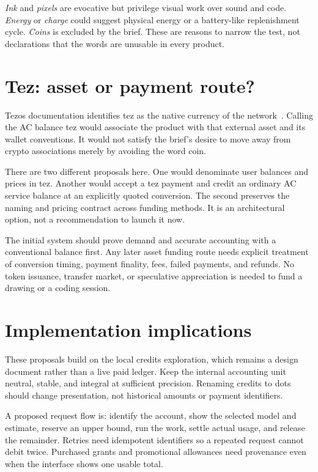 \documentclass[10pt,letterpaper,twocolumn]{article}
\begin{document}
\emph{Ink} and \emph{pixels} are evocative but privilege visual work over sound and code. \emph{Energy} or \emph{charge} could suggest physical energy or a battery-like replenishment cycle. \emph{Coins} is excluded by the brief. These are reasons to narrow the test, not declarations that the words are unusable in every product.

\section{Tez: asset or payment route?}
Tezos documentation identifies tez as the native currency of the network~\cite{tez}. Calling the AC balance tez would associate the product with that external asset and its wallet conventions. It would not satisfy the brief's desire to move away from crypto associations merely by avoiding the word coin.

There are two different proposals here. One would denominate user balances and prices in tez. Another would accept a tez payment and credit an ordinary AC service balance at an explicitly quoted conversion. The second preserves the naming and pricing contract across funding methods. It is an architectural option, not a recommendation to launch it now.

The initial system should prove demand and accurate accounting with a conventional balance first. Any later asset funding route needs explicit treatment of conversion timing, payment finality, fees, failed payments, and refunds. No token issuance, transfer market, or speculative appreciation is needed to fund a drawing or a coding session.

\section{Implementation implications}
These proposals build on the local credits exploration, which remains a design document rather than a live paid ledger. Keep the internal accounting unit neutral, stable, and integral at sufficient precision. Renaming credits to dots should change presentation, not historical amounts or payment identifiers.

A proposed request flow is: identify the account, show the selected model and estimate, reserve an upper bound, run the work, settle actual usage, and release the remainder. Retries need idempotent identifiers so a repeated request cannot debit twice. Purchased grants and promotional allowances need provenance even when the interface shows one usable total.
\end{document}

